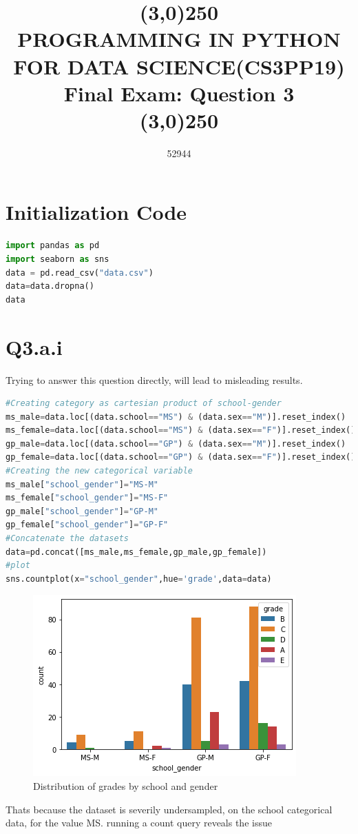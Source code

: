 \documentclass[openany]{article}
\title{\line(3,0){250}\\PROGRAMMING IN PYTHON FOR DATA SCIENCE(CS3PP19) \\ Final Exam: Question 3  \\\line(3,0){250}}
\author{52944}
\begin{document}
	\maketitle
	\section{Initialization Code}
		\begin{lstlisting}[language=Python]
import pandas as pd
import seaborn as sns
data = pd.read_csv("data.csv")
data=data.dropna()
data
		\end{lstlisting}
	\section{Q3.a.i}
		Trying to answer this question directly, will lead to misleading results. 
		\begin{lstlisting}[language=Python]
#Creating category as cartesian product of school-gender
ms_male=data.loc[(data.school=="MS") & (data.sex=="M")].reset_index()
ms_female=data.loc[(data.school=="MS") & (data.sex=="F")].reset_index()
gp_male=data.loc[(data.school=="GP") & (data.sex=="M")].reset_index()
gp_female=data.loc[(data.school=="GP") & (data.sex=="F")].reset_index()
#Creating the new categorical variable
ms_male["school_gender"]="MS-M"
ms_female["school_gender"]="MS-F"
gp_male["school_gender"]="GP-M"
gp_female["school_gender"]="GP-F"
#Concatenate the datasets
data=pd.concat([ms_male,ms_female,gp_male,gp_female])
#plot
sns.countplot(x="school_gender",hue='grade',data=data)
		\end{lstlisting}
		\begin{figure}[H]
			\iftrue
			\centering
			\caption{Distribution of grades by school and gender}
			\includegraphics[scale=0.5]{q3-a-i-1}
			\fi
		\end{figure}
		Thats because the dataset is severily undersampled, on the school categorical data, for the value MS. running a count query reveals the issue
\end{document}
